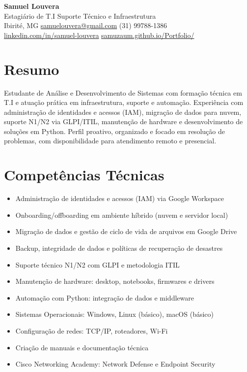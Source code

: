 \documentclass[11pt,a4paper]{article}
\begin{document}
{\LARGE\bfseries Samuel Louvera}\\[3pt]
{\large Estagiário de T.I \textbar{} Suporte Técnico e Infraestrutura}\\[5pt]
Ibirité, MG \quad\textbullet\quad
\href{mailto:samuelouvera@gmail.com}{samuelouvera@gmail.com} \quad\textbullet\quad
(31) 99788-1386\\
\href{https://linkedin.com/in/samuel-louvera}{linkedin.com/in/samuel-louvera} \quad\textbullet\quad
\href{https://samuzaum.github.io/Portfolio/}{samuzaum.github.io/Portfolio/}

\section{Resumo}
Estudante de Análise e Desenvolvimento de Sistemas com formação técnica em T.I e atuação prática em
infraestrutura, suporte e automação. Experiência com administração de identidades e acessos (IAM),
migração de dados para nuvem, suporte N1/N2 via GLPI/ITIL, manutenção de hardware e desenvolvimento
de soluções em Python. Perfil proativo, organizado e focado em resolução de problemas, com
disponibilidade para atendimento remoto e presencial.

\section{Competências Técnicas}
\begin{itemize}
  \item Administração de identidades e acessos (IAM) via Google Workspace
  \item Onboarding/offboarding em ambiente híbrido (nuvem e servidor local)
  \item Migração de dados e gestão de ciclo de vida de arquivos em Google Drive
  \item Backup, integridade de dados e políticas de recuperação de desastres
  \item Suporte técnico N1/N2 com GLPI e metodologia ITIL
  \item Manutenção de hardware: desktop, notebooks, firmwares e drivers
  \item Automação com Python: integração de dados e middleware
  \item Sistemas Operacionais: Windows, Linux (básico), macOS (básico)
  \item Configuração de redes: TCP/IP, roteadores, Wi-Fi
  \item Criação de manuais e documentação técnica
  \item Cisco Networking Academy: Network Defense e Endpoint Security
\end{itemize}
\end{document}
